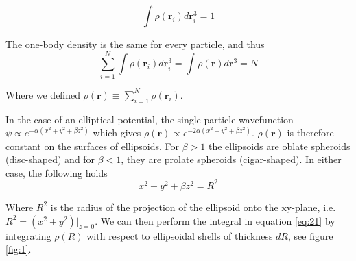 \documentclass[
    a4paper, aps, twocolumn, floatfix, superscriptaddress,
    nofootinbib]{revtex4-1}
\begin{document}
\begin{equation}
    \int \rho(\boldsymbol{r}_i) d\boldsymbol{r}_i^3 =1
\end{equation}

The one-body density is the same for every particle, and thus 
\begin{equation}\label{eq:21}
    \sum_{i=1}^{N}\int \rho(\boldsymbol{r}_i) d\boldsymbol{r}_i^3 =
    \int \rho(\boldsymbol{r}) d\boldsymbol{r}^3 =N
\end{equation}

Where we defined $\rho(\boldsymbol{r}) \equiv \sum_{i=1}^N \rho(\boldsymbol{r}_i)$. 

In the case of an elliptical potential, the single particle wavefunction $\psi \propto e^{-\alpha(x^2+y^2+\beta z^2)}$ which gives 
$\rho(\boldsymbol{r}) \propto e^{-2\alpha(x^2+y^2+\beta z^2)}$. $\rho(\boldsymbol{r})$ is therefore constant on the surfaces of ellipsoids. For $\beta >1$ the ellipsoids are oblate spheroids (disc-shaped) and for $\beta<1$, they are prolate spheroids (cigar-shaped). In either case, the following holds 
\begin{equation}
    x^2+y^2+\beta z^2 = R^2
\end{equation}

Where $R^2$ is the radius of the projection of the ellipsoid onto the xy-plane, i.e. $R^2 = (x^2+y^2)|_{z=0}$. We can then perform the integral in equation \eqref{eq:21} by integrating $\rho(R)$ with respect to ellipsoidal shells of thickness $dR$, see figure \ref{fig:1}. 
\end{document}
